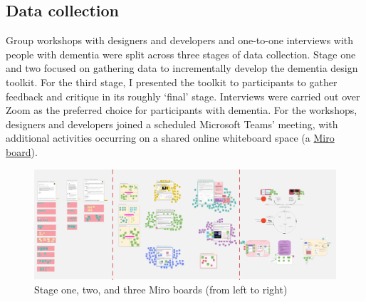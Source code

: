 \subsection{Data collection}
Group workshops with designers and developers and one-to-one interviews with people with dementia were split across three stages of data collection. Stage one and two focused on gathering data to incrementally develop the dementia design toolkit. For the third stage, I presented the toolkit to participants to gather feedback and critique in its roughly ‘final’ stage. Interviews were carried out over Zoom as the preferred choice for participants with dementia. For the workshops, designers and developers joined a scheduled Microsoft Teams’ meeting, with additional activities occurring on a shared online whiteboard space (a \href{https://miro.com}{Miro board}). 

\begin{figure}
\centering
\includegraphics[width=1\linewidth]{Images/D3Toolkit/Fig1.png}
\caption{Stage one, two, and three Miro boards (from left to right)}
\label{fig:StagesD3}
\end{figure}

